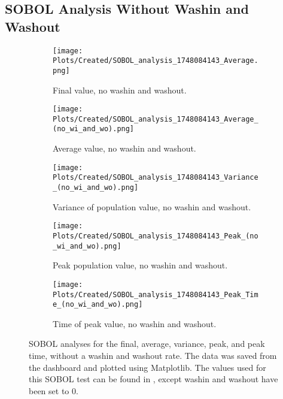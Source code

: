 \subsection{SOBOL Analysis Without Washin and Washout}
\begin{figure}
    \centering
    \begin{subfigure}{0.32\linewidth}
        \centering
        \captionsetup{width=1\linewidth}
        \texttt{[image: Plots/Created/SOBOL\_analysis\_1748084143\_Average.png]}
        \caption{
            Final value, no washin and washout. 
        }
        \label{fig:created:SOBOL_final_no_wi_wo_extra}
    \end{subfigure}
    \hfill
    \begin{subfigure}{0.32\linewidth}
        \centering
        \captionsetup{width=1\linewidth}
        \texttt{[image: Plots/Created/SOBOL\_analysis\_1748084143\_Average\_(no\_wi\_and\_wo).png]}
        \caption{
            Average value, no washin and washout. 
        }
        \label{fig:created:SOBOL_average_no_wi_wo_extra}
    \end{subfigure}
    \hfill
    \begin{subfigure}{0.32\linewidth}
        \centering
        \captionsetup{width=1\linewidth}
        \texttt{[image: Plots/Created/SOBOL\_analysis\_1748084143\_Variance\_(no\_wi\_and\_wo).png]}
        \caption{
            Variance of population value, no washin and washout. 
        }
        \label{fig:created:SOBOL_variance_no_wi_wo_extra}
    \end{subfigure}
    \hfill
    \begin{subfigure}{0.32\linewidth}
        \centering
        \captionsetup{width=1\linewidth}
        \texttt{[image: Plots/Created/SOBOL\_analysis\_1748084143\_Peak\_(no\_wi\_and\_wo).png]}
        \caption{
            Peak population value, no washin and washout. 
        }
        \label{fig:created:SOBOL_peak_no_wi_wo_extra}
    \end{subfigure}
    \hfill
    \begin{subfigure}{0.32\linewidth}
        \centering
        \captionsetup{width=1\linewidth}
        \texttt{[image: Plots/Created/SOBOL\_analysis\_1748084143\_Peak\_Time\_(no\_wi\_and\_wo).png]}
        \caption{
            Time of peak value, no washin and washout. 
        }
        \label{fig:created:SOBOL_peak_time_no_wi_wo_extra}
    \end{subfigure}
    \caption{
        SOBOL analyses for the final, average, variance, peak, and peak time, without a washin and washout rate.
        The data was saved from the dashboard and plotted using Matplotlib. 
        The values used for this SOBOL test can be found in , except washin and washout have been set to 0. 
    }
    \label{fig:created:SOBOL_no_wi_wo_extra}
\end{figure}

